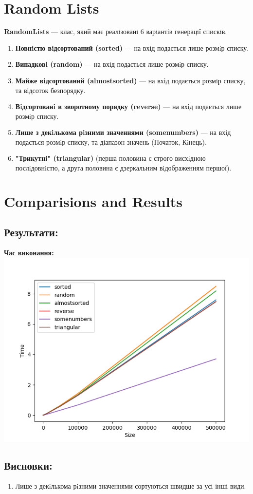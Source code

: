 \documentclass{article}
\begin{document}
\section{Random Lists}
\textbf{RandomLists} --- клас, який має реалiзованi 6 варiантів генерацiї спискiв.
\begin{enumerate}
    \item \textbf{Повнiстю вiдсортований (sorted)} --- на вхід подається лише розмiр списку.
    \item \textbf{Випадковi (random)} --- на вхід подається лише розмiр списку.
    \item \textbf{Майже вiдсортований (almostsorted)} --- на вхід подається розмiр списку, та відсоток безпорядку.
    \item \textbf{Вiдсортованi в зворотному порядку (reverse)} --- на вхід подається лише розмiр списку.
    \item \textbf{Лише з декiлькома рiзними значеннями (somenumbers)} --- на вхід подається розмiр списку, та діапазон значень (Початок, Кiнець).
    \item \textbf{"Трикутнi" (triangular)} (перша половина є строго висхiдною послiдовнiстю, а друга половина є дзеркальним вiдображенням першої).
\end{enumerate}
\newpage

\section{Comparisions and Results}
    \subsection{Результати:}
    \textbf{Час виконання:}
    \newline
        \includegraphics{triangular_Time_7_numbers.png}
    \subsection{Висновки:}
    \begin{enumerate}
        \item Лише з декiлькома рiзними значеннями сортуються швидше за усі інші види.
    \end{enumerate}
    \newpage
\end{document}
